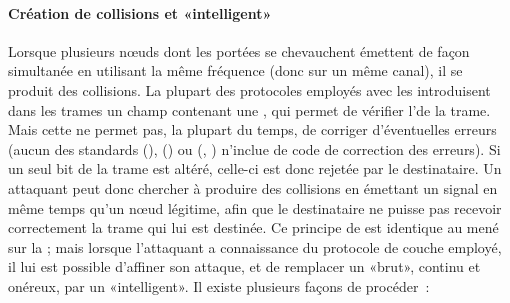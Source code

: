         \paragraph{Création de collisions et  «intelligent»}
Lorsque plusieurs nœuds dont les portées se chevauchent émettent de façon simultanée en utilisant la même fréquence (donc sur un même canal), il se produit des collisions.
La plupart des protocoles \mac employés avec les \rcs introduisent dans les trames un champ contenant une , qui permet de vérifier l'\integrite de la trame.
Mais cette  ne permet pas, la plupart du temps, de corriger d'éventuelles erreurs (aucun des standards \ieeee (\wifi), \ieeefo (\bluetooth) ou \ieeeff (\zigbee, \slowpan) n'inclue de code de correction des erreurs).
Si un seul bit de la trame est altéré, celle-ci est donc rejetée par le destinataire.
Un attaquant peut donc chercher à produire des collisions en émettant un signal en même temps qu'un nœud légitime, afin que le destinataire ne puisse pas recevoir correctement la trame qui lui est destinée.
Ce principe de  est identique au  mené sur la ; mais lorsque l'attaquant a connaissance du protocole de couche \mac{} employé, il lui est possible d'affiner son attaque, et de remplacer un  «brut», continu et onéreux, par un  «intelligent».
Il existe plusieurs façons de procéder~\cite{PI11}:
